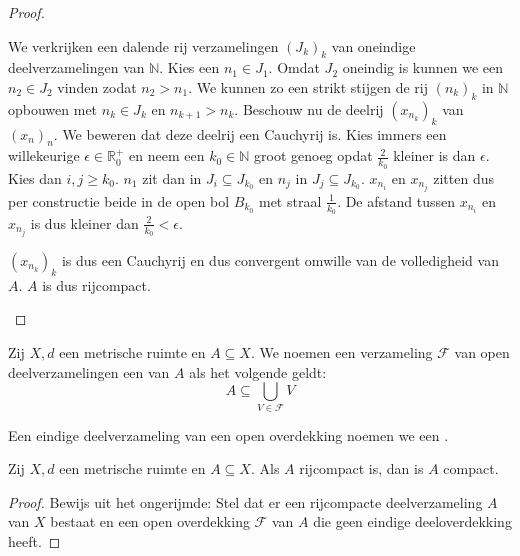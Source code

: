 \documentclass[main.tex]{subfiles}
\begin{document}
\begin{bst}
\begin{proof}
\begin{itemize}
      We verkrijken een dalende rij verzamelingen $(J_{k})_{k}$ van oneindige deelverzamelingen van $\mathbb{N}$. Kies een $n_{1}\in J_{1}$. Omdat $J_{2}$ oneindig is kunnen we een $n_{2}\in J_{2}$ vinden zodat $n_{2} > n_{1}$. We kunnen zo een strikt stijgen de rij $(n_{k})_{k}$ in $\mathbb{N}$ opbouwen met $n_{k}\in J_{k}$ en $n_{k+1} > n_{k}$.
      Beschouw nu de deelrij $(x_{n_{k}})_{k}$ van $(x_{n})_{n}$.
      We beweren dat deze deelrij een Cauchyrij is.
      Kies immers een willekeurige $\epsilon \in \mathbb{R}_{0}^{+}$ en neem een $k_{0}\in \mathbb{N}$ groot genoeg opdat $\frac{2}{k_{0}}$ kleiner is dan $\epsilon$.
      Kies dan $i,j \ge k_{0}$. $n_{1}$ zit dan in $J_{i} \subseteq J_{k_{0}}$ en $n_{j}$ in $J_{j} \subseteq J_{k_{0}}$.
      $x_{n_{i}}$ en $x_{n_{j}}$ zitten dus per constructie beide in de open bol $B_{k_{0}}$ met straal $\frac{1}{k_{0}}$.
      De afstand tussen $x_{n_{i}}$ en $x_{n_{j}}$ is dus kleiner dan $\frac{2}{k_{0}} < \epsilon$.

      $(x_{n_{k}})_{k}$ is dus een Cauchyrij en dus convergent omwille van de volledigheid van $A$.
      $A$ is dus rijcompact.
    \end{itemize}
  \end{proof}
\end{bst}
\fi

\begin{de}
  Zij $X,d$ een metrische ruimte en $A \subseteq X$.
  We noemen een verzameling $\mathcal{F}$ van open deelverzamelingen een  van $A$ als het volgende geldt:
  \[ A \subseteq \bigcup_{V \in \mathcal{F}}V \]
\end{de}

\begin{de}
  Een eindige deelverzameling van een open overdekking noemen we een .
\end{de}

\begin{bst}
  \label{st:rijcompact-dan-compact}
  Zij $X,d$ een metrische ruimte en $A \subseteq X$.
  Als $A$ rijcompact is, dan is $A$ compact.

  \begin{proof}
    Bewijs uit het ongerijmde:
    Stel dat er een rijcompacte deelverzameling $A$ van $X$ bestaat en een open overdekking $\mathcal{F}$ van $A$ die geen eindige deeloverdekking heeft.
  \end{proof}
\end{bst}
\end{document}

